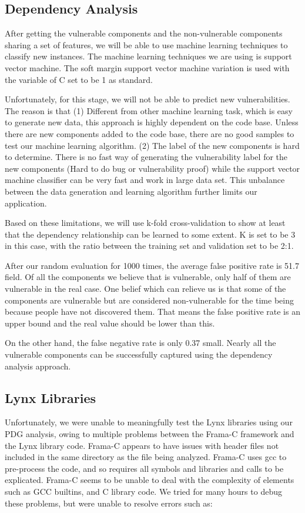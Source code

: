 \documentclass{acm_proc_article-sp}
\begin{document}
\subsection{Dependency Analysis}
After getting the vulnerable components and the non-vulnerable components 
sharing a set of features, we will be able to use machine learning techniques 
to classify new instances. The machine learning techniques we are using is 
support vector machine. The soft margin support vector machine variation is 
used with the variable of C set to be 1 as standard.

Unfortunately, for this stage, we will not be able to predict new 
vulnerabilities. The reason is that (1) Different from other machine learning 
task, which is easy to generate new data, this approach is highly dependent on 
the code base. Unless there are new components added to the code base, there 
are no good samples to test our machine learning algorithm. (2) The label of 
the new components is hard to determine. There is no fast way of generating the 
vulnerability label for the new components (Hard to do bug or vulnerability 
proof) while the support vector machine classifier can be very fast and work in 
large data set. This unbalance between the data generation and learning 
algorithm further limits our application.

Based on these limitations, we will use k-fold cross-validation to show at 
least that the dependency relationship can be learned to some extent. K is set 
to be 3 in this case, with the ratio between the training set and validation 
set to be 2:1.

After our random evaluation for 1000 times, the average false positive rate is 
51.7%
field. Of all the components we believe that is vulnerable, only half of them 
are vulnerable in the real case. One belief which can relieve us is that some 
of the components are vulnerable but are considered non-vulnerable for the time 
being because people have not discovered them. That means the false positive 
rate is an upper bound and the real value should be lower than this.

On the other hand, the false negative rate is only 0.37%
small. Nearly all the vulnerable components can be successfully captured using 
the dependency analysis approach.

\subsection{Lynx Libraries}
Unfortunately, we were unable to meaningfully test the Lynx libraries using 
our PDG analysis, owing to multiple problems between the Frama-C framework and 
the Lynx library code. Frama-C appears to have issues with header files not 
included in the same directory as the file being analyzed. Frama-C uses gcc to 
pre-process the code, and so requires all symbols and libraries and calls to be 
explicated. Frama-C seems to be unable to deal with the complexity of elements 
such as GCC builtins, and C library code. We tried for many hours to debug 
these problems, but were unable to resolve errors such as:
\end{document}
